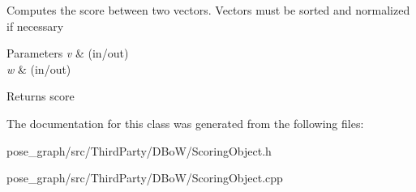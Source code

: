Computes the score between two vectors. Vectors must be sorted and normalized if necessary 
\begin{DoxyParams}{Parameters}
{\em v} & (in/out) \\
\hline
{\em w} & (in/out) \\
\hline
\end{DoxyParams}
\begin{DoxyReturn}{Returns}
score 
\end{DoxyReturn}


The documentation for this class was generated from the following files\+:\begin{DoxyCompactItemize}
\item 
pose\+\_\+graph/src/\+Third\+Party/\+D\+Bo\+W/Scoring\+Object.\+h\item 
pose\+\_\+graph/src/\+Third\+Party/\+D\+Bo\+W/Scoring\+Object.\+cpp\end{DoxyCompactItemize}
